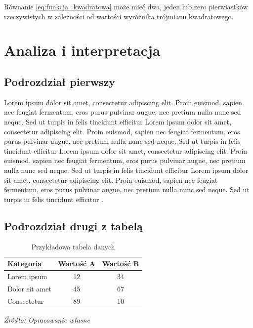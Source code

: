 Równanie \ref{eq:funkcja_kwadratowa} może mieć dwa, jeden lub zero pierwiastków rzeczywistych w zależności od wartości wyróżnika trójmianu kwadratowego.

\section{Analiza i interpretacja}

\subsection{Podrozdział pierwszy}

Lorem ipsum dolor sit amet, consectetur adipiscing elit. Proin euismod, sapien nec feugiat fermentum, eros purus pulvinar augue, nec pretium nulla nunc sed neque. Sed ut turpis in felis tincidunt efficitur Lorem ipsum dolor sit amet, consectetur adipiscing elit. Proin euismod, sapien nec feugiat fermentum, eros purus pulvinar augue, nec pretium nulla nunc sed neque. Sed ut turpis in felis tincidunt efficitur Lorem ipsum dolor sit amet, consectetur adipiscing elit. Proin euismod, sapien nec feugiat fermentum, eros purus pulvinar augue, nec pretium nulla nunc sed neque. Sed ut turpis in felis tincidunt efficitur Lorem ipsum dolor sit amet, consectetur adipiscing elit. Proin euismod, sapien nec feugiat fermentum, eros purus pulvinar augue, nec pretium nulla nunc sed neque. Sed ut turpis in felis tincidunt efficitur \parencite{article}.

\subsection{Podrozdział drugi z tabelą}

\begin{table}[ht]
\centering
\caption{Przykładowa tabela danych}
\label{tab:przykladowa_tabela}
\begin{tabular}{|>{\raggedright\arraybackslash}p{4cm}|c|c|}
\hline
\textbf{Kategoria} & \textbf{Wartość A} & \textbf{Wartość B} \\
\hline
Lorem ipsum        & 12                & 34                 \\
Dolor sit amet     & 45                & 67                 \\
Consectetur        & 89                & 10                 \\
\hline
\end{tabular}

\vspace{4pt} %
{\raggedright\fontsize{10pt}{12pt}\selectfont\textit{Źródło: Opracowanie własne}\par}
\end{table}



